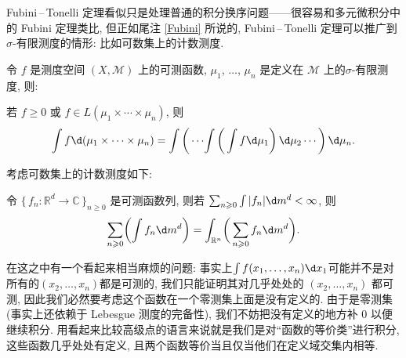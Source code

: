 \begin{alterendnote}
    Fubini\,--\,Tonelli 定理看似只是处理普通的积分换序问题------很容易和多元微积分中的 Fubini 定理类比, 但正如尾注 \ref{Fubini} 所说的, Fubini\,--\,Tonelli 定理可以推广到$\sigma $-有限测度的情形: 比如可数集上的计数测度.
    \begin{theorem}
        令 $f$ 是测度空间 $(X,\mathcal M)$ 上的可测函数, $\mu _1$, $\dots $, $\mu _n$ 是定义在 $\mathcal M$ 上的$\sigma $-有限测度, 则:

        若 $f\geqslant 0$ 或 $f\in L(\mu_1 \times \cdots \times \mu _n)$, 则
        \[
            \int f \d (\mu_1\times \cdots \times \mu _n) = \int\left(\,\cdots \!\int\left(\, \int f \d \mu_1 \right) \d \mu_2\cdots \right)\d \mu_n
            .\]
    \end{theorem}
    考虑可数集上的计数测度如下:
    \begin{theorem}
        令 $\{\,f_n: \mathbb R^d\to \mathbb C\,\}_{n\geqslant 0}$ 是可测函数列, 则若 $\sum_{n\geqslant 0}\int |f_n|\d m^d<\infty$, 则
        \[
            \sum_{n\geqslant 0}\biggl(\int f_n\d m^d\biggr) = \int_{\mathbb R^n}\biggl(\,\sum_{n\geqslant 0} f_n\d m^d\biggr)
            .\]
    \end{theorem}
\end{alterendnote}
\begin{alterendnote}
    在这之中有一个看起来相当麻烦的问题: 事实上$\int f(x_1,\dots,x_n)\d x_1$可能并不是对所有的$(x_2,\dots,x_n)$都是可测的, 我们只能证明其对几乎处处的 $(x_2,\dots,x_n)$ 都可测, 因此我们必然要考虑这个函数在一个零测集上面是没有定义的. 由于是零测集(事实上还依赖于 Lebesgue 测度的完备性), 我们不妨把没有定义的地方补 $0$ 以便继续积分. 用看起来比较高级点的语言来说就是我们是对``函数的等价类''进行积分, 这些函数几乎处处有定义, 且两个函数等价当且仅当他们在定义域交集内相等.
\end{alterendnote}
